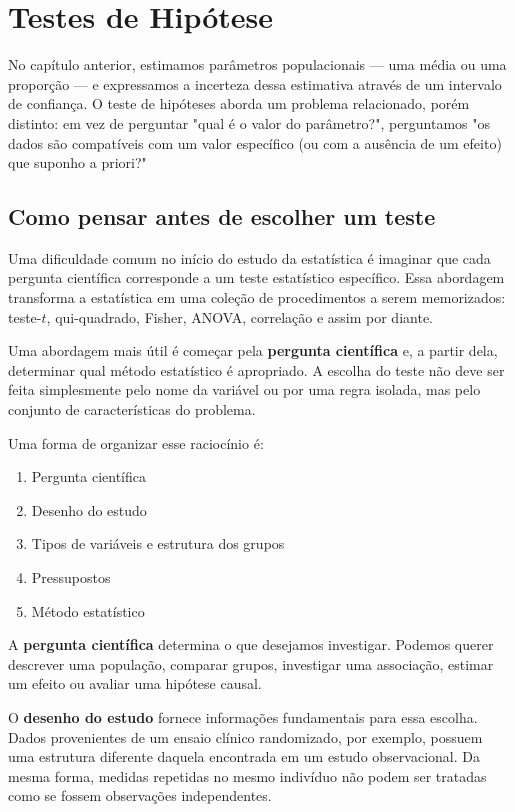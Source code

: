 \chapter{Testes de Hipótese}

No capítulo anterior, estimamos parâmetros populacionais --- uma média ou uma proporção --- e expressamos a incerteza dessa estimativa através de um intervalo de confiança. O teste de hipóteses aborda um problema relacionado, porém distinto: em vez de perguntar "qual é o valor do parâmetro?", perguntamos "os dados são compatíveis com um valor específico (ou com a ausência de um efeito) que suponho a priori?"

\section{Como pensar antes de escolher um teste}

Uma dificuldade comum no início do estudo da estatística é imaginar que cada
pergunta científica corresponde a um teste estatístico específico. Essa
abordagem transforma a estatística em uma coleção de procedimentos a serem
memorizados: teste-$t$, qui-quadrado, Fisher, ANOVA, correlação e assim por
diante.

Uma abordagem mais útil é começar pela \textbf{pergunta científica} e, a
partir dela, determinar qual método estatístico é apropriado. A escolha do
teste não deve ser feita simplesmente pelo nome da variável ou por uma regra
isolada, mas pelo conjunto de características do problema.

Uma forma de organizar esse raciocínio é:

\begin{enumerate}
\item Pergunta científica
\item Desenho do estudo
\item Tipos de variáveis e estrutura dos grupos
\item Pressupostos
\item Método estatístico
\end{enumerate}

A \textbf{pergunta científica} determina o que desejamos investigar. Podemos
querer descrever uma população, comparar grupos, investigar uma associação,
estimar um efeito ou avaliar uma hipótese causal.

O \textbf{desenho do estudo} fornece informações fundamentais para essa
escolha. Dados provenientes de um ensaio clínico randomizado, por exemplo,
possuem uma estrutura diferente daquela encontrada em um estudo observacional.
Da mesma forma, medidas repetidas no mesmo indivíduo não podem ser tratadas
como se fossem observações independentes.

